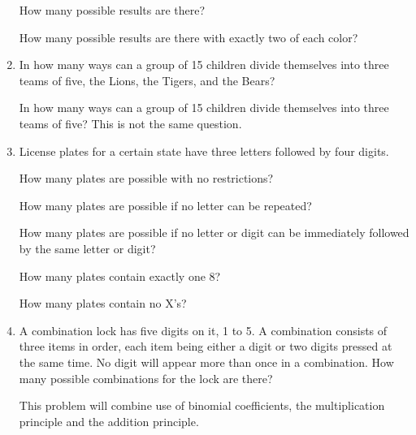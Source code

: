 \documentclass[12pt]{article}
\begin{document}
\begin{enumerate}
How many possible results are there?

How many possible results are there with exactly two of each color?

\newpage

\item  In how many ways can a group of 15 children divide themselves into three teams of five, the Lions, the Tigers, and the Bears?

In how many ways can a group of 15 children divide themselves into three teams of five?  This is not the same question.

\newpage

\item  License plates for a certain state have three letters followed by four digits.

How many plates are possible with no restrictions?

How many plates are possible if no letter can be repeated?

How many plates are possible if no letter or digit can be immediately followed by the same letter or digit?

How many plates contain exactly one 8?

How many plates contain no X's?

\newpage

\item  A combination lock has five digits on it, 1 to 5.  A combination consists of three items in order, each item being either a digit
or two digits pressed at the same time.  No digit will appear more than once in a combination.  How many possible combinations for the lock are there?

This problem will combine use of binomial coefficients, the multiplication principle and the addition principle.

\end{enumerate}
\end{document}
